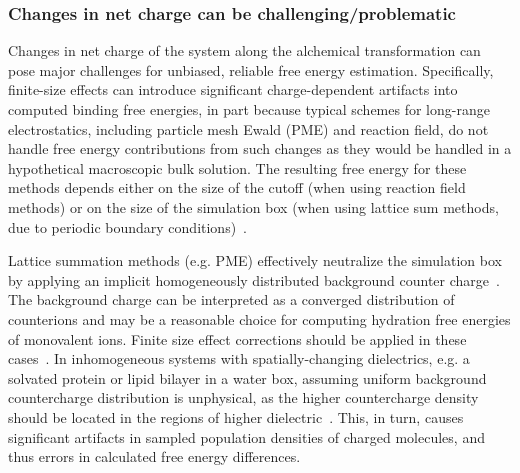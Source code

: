 \documentclass[9pt,bestpractices]{livecoms}
\begin{document}
\subsubsection{Changes in net charge can be challenging/problematic}
\label{subsec:net charge}
Changes in net charge of the system along the alchemical transformation can pose major challenges for unbiased, reliable free energy estimation.
Specifically, finite-size effects can introduce significant charge-dependent artifacts into computed binding free energies, in part because typical schemes for long-range electrostatics, including particle mesh Ewald (PME) and reaction field, do not handle free energy contributions from such changes as they would be handled in a hypothetical macroscopic bulk solution. The resulting free energy for these methods  depends either on the size of the cutoff (when using reaction field methods) or on the size of the simulation box (when using lattice sum methods, due to periodic boundary conditions)~\cite{lin2014overview, ohlknecht2020correcting, rocklin2013calculating}.

Lattice summation methods (e.g. PME) effectively neutralize the simulation box by applying an implicit homogeneously distributed background counter charge~\cite{figueirido1995finite,hummer1996free}. The background charge can be interpreted as a converged distribution of counterions and may be a reasonable choice for computing hydration free energies of monovalent ions. Finite size effect corrections should be applied in these cases~\cite{hummer1996free}. In inhomogeneous systems with spatially-changing dielectrics, e.g. a solvated protein or lipid bilayer in a water box, assuming uniform background countercharge distribution is unphysical, as the higher countercharge density should be located in the regions of higher dielectric~\cite{hub2014pme}. This, in turn, causes significant artifacts in sampled population densities of charged molecules, and thus errors in calculated free energy differences.
\end{document}
